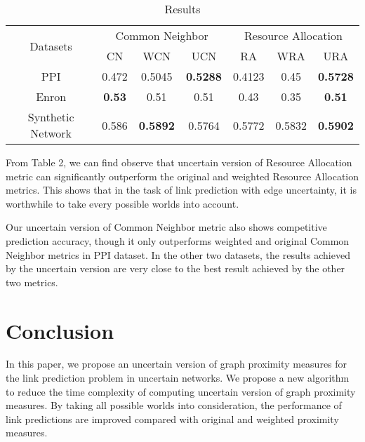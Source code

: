 \documentclass[\main/thesis.tex]{subfiles}
\begin{document}
\begin{table}[]
\centering
\caption{Results}
\label{my-label}
\begin{tabular}{c|c|c|c||c|c|c}
\hline
\multirow{2}{*}{Datasets} & \multicolumn{3}{c||}{Common Neighbor}              & \multicolumn{3}{c}{Resource Allocation} \\ \cline{2-7} 
                          & CN            & WCN             & UCN             & RA        & WRA      & URA               \\ \hline
PPI                       & 0.472         & 0.5045          & \textbf{0.5288} & 0.4123    & 0.45     & \textbf{0.5728}   \\ \hline
Enron                     & \textbf{0.53} & 0.51            & 0.51            & 0.43      & 0.35     & \textbf{0.51}     \\ \hline
Synthetic Network         & 0.586         & \textbf{0.5892} & 0.5764          & 0.5772    & 0.5832   & \textbf{0.5902}   \\ \hline
\end{tabular}
\end{table}

From Table 2, we can find observe that uncertain version of Resource Allocation metric can significantly outperform the original and weighted Resource Allocation metrics. This shows that in the task of link prediction with edge uncertainty, it is worthwhile to take every possible worlds into account.

Our uncertain version of Common Neighbor metric also shows competitive prediction accuracy, though it only outperforms weighted and original Common Neighbor metrics in PPI dataset. In the other two datasets, the results achieved by the uncertain version are very close to the best result achieved by the other two metrics.%

\section{Conclusion}
In this paper, we propose an uncertain version of graph proximity measures for the link prediction problem in uncertain networks. We propose a new algorithm to reduce the time complexity of computing uncertain version of graph proximity measures. By taking all possible worlds into consideration, the performance of link predictions are improved compared with original and weighted proximity measures.
\end{document}
